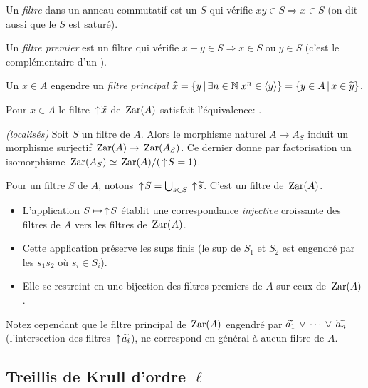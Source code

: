 Un \emph{filtre} dans un anneau commutatif est un \mo $S$ qui  vérifie
$xy\in S\Rightarrow x\in S$ (on dit aussi que le \mo $S$ est saturé). 

Un \emph{filtre premier} est un filtre 
qui vérifie $x+y\in S\Rightarrow x\in S\;\mathrm{ou}\;y\in S$ (c'est 
le complémentaire d'un \idep). 

Un $x\in A$ engendre un \emph{filtre principal} $\widehat x=\{y\,\vert\,\exists n\in\mathbb{N}\;x^n\in\left\langle{y}\right\rangle\}=\{y\in A\,\vert\,x\in \widetilde y\}$.

Pour $x\in A$ le filtre $\,\uparrow\!{\widetilde x}$ de $\,{\rm Zar}(A)$ satisfait l'équivalence: 
.

\begin{fact}
\label{factLocalises} \emph{(localisés)}
Soit $S$ un filtre de $A$. 
Alors le morphisme naturel $A\to A_S$ induit un morphisme surjectif $\,{\rm Zar}(A)\to\,{\rm Zar}(A_S)$. Ce dernier donne par factorisation un isomorphisme $\,{\rm Zar}(A_S)\simeq
\,{\rm Zar}(A)/(\,\uparrow\! S =1)$.
\end{fact}


\begin{proposition}
\label{factFZ} Pour un filtre $S$ de $A$, notons $\,\uparrow\! S=\bigcup_{s\in S} \,\uparrow\! \widetilde s$. C'est un filtre de $\,{\rm Zar}(A)$.
\begin{itemize}
%
\item 
L'application $S\mapsto  \,\uparrow\! S$ établit une correspondance
\emph{injective} croissante des filtres de $A$ vers les filtres de 
$\,{\rm Zar}(A)$. 
%
\item  Cette application préserve les sups finis
(le sup de $S_1$ et $S_2$  est engendré par les 
$s_1s_2$ où
$s_i\in S_i$).
%
\item Elle  se restreint en une bijection des filtres
premiers de $A$ sur ceux de $\,{\rm Zar}(A)$. 
\end{itemize}
\end{proposition}

Notez cependant que le filtre principal de $\,{\rm Zar}(A)$ engendré par
$\widetilde{a_1}\,\vee\,\cdots \,\vee\, \widetilde{a_n}$ (\cad l'intersection des filtres 
$\,\uparrow\!\widetilde
{a_i}$), ne correspond en général à aucun filtre de $A$.





\subsection{Treillis de Krull d'ordre $\ell$}
\label{subsubsecKrulac}

